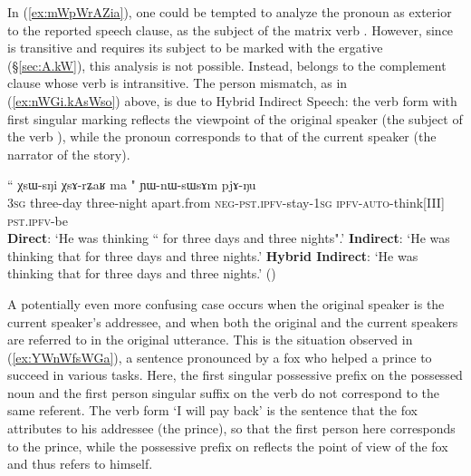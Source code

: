 In (\ref{ex:mWpWrAZia}), one could be tempted to analyze the pronoun  as exterior to the reported speech clause, as the subject of the matrix verb . However, since  is transitive and requires its subject to be marked with the ergative (§\ref{sec:A.kW}), this analysis is not possible. Instead,   belongs to the complement clause whose verb  is intransitive. The person mismatch, as in (\ref{ex:nWGi.kAsWso}) above, is due to Hybrid Indirect Speech: the verb form  with first singular marking reflects the viewpoint of the original speaker (the subject of the verb ), while the pronoun  corresponds to that of the current speaker (the narrator of the story). 
  
\begin{exe}
\ex \label{ex:mWpWrAZia}
\gll   `` χsɯ-sŋi χsɤ-rʑaʁ ma " ɲɯ-nɯ-sɯsɤm pjɤ-ŋu \\
 \textsc{3sg} three-day  three-night apart.from \textsc{neg}-\textsc{pst}.\textsc{ipfv}-stay-\textsc{1sg} \textsc{ipfv}-\textsc{auto}-think[III] \textsc{pst}.\textsc{ipfv}-be \\
\glt    \textbf{Direct}: `He was thinking `` for three days and three nights".'
\glt    \textbf{Indirect}: `He was thinking that  for three days and three nights.'
\glt  \textbf{Hybrid Indirect}: `He was thinking that   for three days and three nights.' 
()
\end{exe}

 

A potentially even more confusing case occurs when the original speaker is the current speaker's addressee, and when both the original and the current speakers are referred to in the original utterance. This is the situation observed in (\ref{ex:YWnWfsWGa}), a sentence pronounced by a fox who helped a prince to succeed in various tasks. Here,  the first singular possessive prefix  on the possessed noun  and the first person singular suffix  on the verb  do not correspond to the same referent. The verb form  `I will pay back' is the sentence that the fox attributes to his addressee (the prince), so that the first person here corresponds to the prince, while the possessive prefix on  reflects the point of view of the fox and thus refers to himself.

